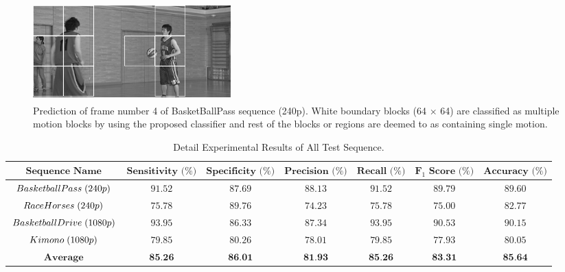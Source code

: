 \documentclass{article}
\begin{document}
\begin{figure}[t]
	\centering
	\includegraphics[width=3in, height= 1.5in]{Figures/prediction}
	\caption{Prediction of frame number 4 of BasketBallPass sequence (240p). White boundary blocks (64 $\times$ 64) are classified as multiple motion blocks by using the proposed classifier and rest of the blocks or regions are deemed to as containing single motion.}
	\vspace{-2.5mm}
	\label{fig:prediction}
\end{figure}

\begin{table}[t]
	\centering
	\caption{Detail Experimental Results of All Test Sequence.}
	\vspace{1mm}
	\small
	\renewcommand{\arraystretch}{1.3}
	\begin{tabular}{ |c|c|c|c|c|c|c| }
		\hline $\textbf{Sequence Name}$ & $\textbf{Sensitivity (\%)}$ & $\textbf{Specificity (\%)}$ & $\textbf{Precision (\%)}$ & $\textbf{Recall (\%)}$ & $\textbf{F$_{1}$ Score (\%)}$ & $\textbf{Accuracy (\%)}$  \\
		\hline ${BasketballPass \hspace{.1cm} (240p)}$  & $91.52$ & $87.69$ & $88.13$  & $91.52$ & $89.79$ & $89.60$  \\
		\hline ${RaceHorses \hspace{.1cm} (240p)}$ & $75.78$ & $89.76$ & $74.23$  & $75.78$ & $75.00$ & $82.77$  \\
		\hline ${BasketballDrive \hspace{.1cm}(1080p)}$ & $93.95$ & $86.33$ & $87.34$  & $93.95$ & $90.53$ & $90.15$  \\
		\hline ${Kimono \hspace{.1cm} (1080p)}$  & $79.85$ & $80.26$ & $78.01$  & $79.85$ & $77.93$ & $80.05$  \\
		\hline $\textbf{Average}$ &  $\textbf{85.26}$ & $\textbf{86.01}$ & $\textbf{81.93}$ & $\textbf{85.26}$ & $\textbf{83.31}$ & $\textbf{85.64}$ \\
		\hline
	\end{tabular}
	\vspace{-3.5mm}
	\label{tab:allTable}
\end{table}
\end{document}
